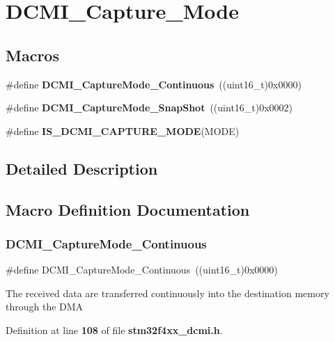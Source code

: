 \section{D\+C\+M\+I\+\_\+\+Capture\+\_\+\+Mode}
\label{group__DCMI__Capture__Mode}
\subsection*{Macros}
\begin{DoxyCompactItemize}
\item 
\#define \textbf{ D\+C\+M\+I\+\_\+\+Capture\+Mode\+\_\+\+Continuous}~((uint16\+\_\+t)0x0000)
\item 
\#define \textbf{ D\+C\+M\+I\+\_\+\+Capture\+Mode\+\_\+\+Snap\+Shot}~((uint16\+\_\+t)0x0002)
\item 
\#define \textbf{ I\+S\+\_\+\+D\+C\+M\+I\+\_\+\+C\+A\+P\+T\+U\+R\+E\+\_\+\+M\+O\+DE}(M\+O\+DE)
\end{DoxyCompactItemize}


\subsection{Detailed Description}


\subsection{Macro Definition Documentation}
\mbox{\label{group__DCMI__Capture__Mode_gafc4b1ac09dcbc966fd0626d388b3e34b}} 
\subsubsection{D\+C\+M\+I\+\_\+\+Capture\+Mode\+\_\+\+Continuous}
{\footnotesize\ttfamily \#define D\+C\+M\+I\+\_\+\+Capture\+Mode\+\_\+\+Continuous~((uint16\+\_\+t)0x0000)}

The received data are transferred continuously into the destination memory through the D\+MA 

Definition at line \textbf{ 108} of file \textbf{ stm32f4xx\+\_\+dcmi.\+h}.

